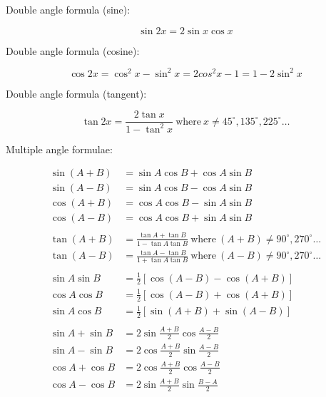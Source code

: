 Double angle formula (sine):

\begin{equation}
    \sin 2x = 2\sin x \cos x
    \label{eq:double_angle_sin}
\end{equation}

Double angle formula (cosine):

\begin{equation}
    \cos 2x = \cos^2 x - \sin^2 x = 2cos^2 x - 1 = 1 - 2\sin^2 x
    \label{eq:double_angle_cos}
\end{equation}

Double angle formula (tangent):

\begin{equation}
    \tan 2x = \frac{2\tan x}{1 - \tan^2 x} \ \text{where} \ x \neq 45^{\circ}, 135^{\circ}, 225^{\circ} \dots
    \label{eq:double_angle_tan}
\end{equation}

Multiple angle formulae:

\begin{equation}
    \begin{aligned}
        \sin(A + B) &= \sin A \cos B + \cos A \sin B \\
        \sin(A - B) &= \sin A \cos B - \cos A \sin B \\
        \cos(A + B) &= \cos A \cos B - \sin A \sin B \\
        \cos(A - B) &= \cos A \cos B + \sin A \sin B \\\\
        \tan(A + B) &= \frac{\tan A + \tan B}{1 - \tan A \tan B} \ \text{where} \ (A + B) \neq 90^{\circ}, 270^{\circ} \dots\\
        \tan(A - B) &= \frac{\tan A - \tan B}{1 + \tan A \tan B} \ \text{where} \ (A - B) \neq 90^{\circ}, 270^{\circ} \dots\\\\
        \sin A \sin B &= \frac{1}{2}[\cos(A - B) - \cos(A + B)] \\
        \cos A \cos B &= \frac{1}{2}[\cos(A - B) + \cos(A + B)] \\
        \sin A \cos B &= \frac{1}{2}[\sin(A + B) + \sin(A - B)] \\\\
        \sin A + \sin B &= 2\sin\frac{A + B}{2} \cos\frac{A - B}{2}\\
        \sin A - \sin B &= 2\cos\frac{A + B}{2} \sin\frac{A - B}{2}\\
        \cos A + \cos B &= 2\cos\frac{A + B}{2} \cos\frac{A - B}{2}\\
        \cos A - \cos B &= 2\sin\frac{A + B}{2} \sin\frac{B - A}{2}
    \end{aligned}
    \label{eq:multi_angle}
\end{equation}

